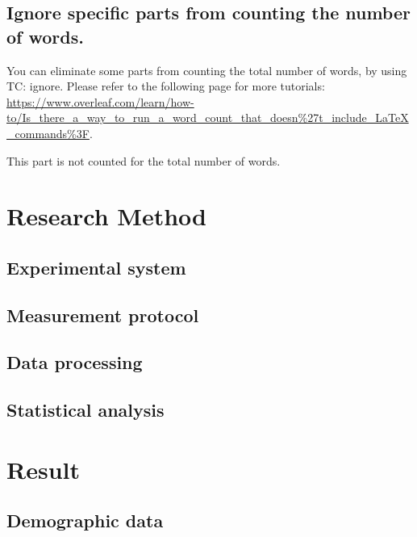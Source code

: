 \documentclass[12pt]{article}
\begin{document}
\subsection{Ignore specific parts from counting the number of words.}
You can eliminate some parts from counting the total number of words, by using TC: ignore.
Please refer to the following page for more tutorials: \url{https://www.overleaf.com/learn/how-to/Is_there_a_way_to_run_a_word_count_that_doesn%27t_include_LaTeX_commands%3F}.

This part is not counted for the total number of words.



% 
% 
\section{Research Method}
\subsection{Experimental system}
\subsection{Measurement protocol}
\subsection{Data processing}
\subsection{Statistical analysis}



% 
% 
\section{Result}
\subsection{Demographic data}


% 
% 
\end{document}
